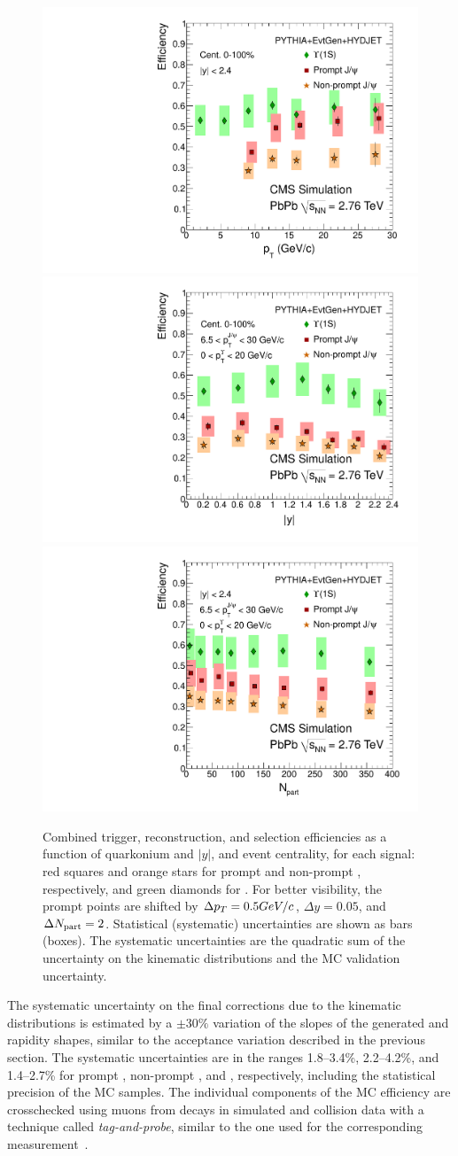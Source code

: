 \begin{figure}[htbp]
  \centering
  \includegraphics[width=0.45\linewidth]{chap_YInPbPbColl2010_figures/QuarkoniaEff_pt}
  \includegraphics[width=0.45\linewidth]{chap_YInPbPbColl2010_figures/QuarkoniaEff_y}\\
  \includegraphics[width=0.45\linewidth]{chap_YInPbPbColl2010_figures/QuarkoniaEff_cent}
  \caption{Combined trigger, reconstruction, and selection
    efficiencies as a function of quarkonium \pt and $|y|$, and event
    centrality, for each signal: red squares and orange stars for
    prompt and non-prompt \Jpsi, respectively, and green diamonds for
    \PgUa. For better visibility, the prompt \Jpsi points are shifted
    by $\Delta p_T = 0.5GeV/c$, $\Delta y=0.05$, and $\Delta N_{\text{part}} =
    2$. Statistical (systematic) uncertainties are shown as bars
    (boxes). The systematic uncertainties are the quadratic sum of the
    uncertainty on the kinematic distributions and the MC validation
    uncertainty.}
  \label{fig:eff}
\end{figure}

The systematic uncertainty on the final corrections due to the
kinematic distributions is estimated by a $\pm30\%$ variation of the
slopes of the generated \pt and rapidity shapes, similar to the
acceptance variation described in the previous section. The systematic
uncertainties are in the ranges 1.8--3.4\%, 2.2--4.2\%, and 1.4--2.7\%
for prompt \Jpsi, non-prompt \Jpsi, and \PgUa, respectively, including
the statistical precision of the MC samples.
The individual components of the MC efficiency are crosschecked using
muons from \Jpsi decays in simulated and collision data with a
technique called \emph{tag-and-probe}, similar to the one used for the
corresponding \pp measurement~\cite{Khachatryan:2010yr}.

